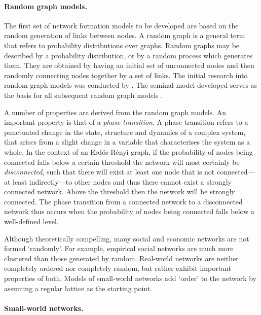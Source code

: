 \paragraph{Random graph models.}

The first set of network formation models to be developed are based on the random generation of links between nodes. A random graph is a general term that refers to probability distributions over graphs. Random graphs may be described by a probability distribution, or by a random process which generates them. They are obtained by having an initial set of unconnected nodes and then randomly connecting nodes together by a set of links. The initial research into random graph models was conducted by \citet{ErdosRenyi1959}. The seminal model developed serves as the basis for all subsequent random graph models \citep{Gilbert1959, Bollobas2001}.

A number of properties are derived from the random graph models. An important property is that of a \emph{phase transition}. A phase transition refers to a punctuated change in the state, structure and dynamics of a complex system, that arises from a slight change in a variable that characterises the system as a whole. In the context of an Erd\"{o}s-R\'{e}nyi graph, if the probability of nodes being connected falls below a certain threshold the network will most certainly be \emph{disconnected}, such that there will exist at least one node that is not connected---at least indirectly---to other nodes and thus there cannot exist a strongly connected network. Above the threshold then the network will be strongly connected. The phase transition from a connected network to a disconnected network thus occurs when the probability of nodes being connected falls below a well-defined level.

Although theoretically compelling, many social and economic networks are not formed `randomly'. For example, empirical social networks are much more clustered than those generated by random. Real-world networks are neither completely ordered nor completely random, but rather exhibit important properties of both. Models of small-world networks add `order' to the network by assuming a regular lattice as the starting point.

\paragraph{Small-world networks.}

